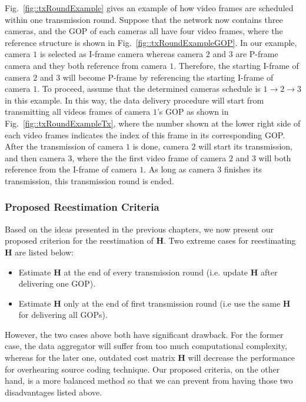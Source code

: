 {Fig.~\ref{fig::txRoundExample} gives an example of how video frames are scheduled within one transmission round.
Suppose that the network now contains three cameras, and the GOP of each cameras all have four video frames, where the reference structure is shown in Fig.~\ref{fig::txRoundExampleGOP}.
In our example, camera $1$ is selected as I-frame camera whereas camera $2$ and $3$ are P-frame camera and they both reference from camera $1$.
Therefore, the starting I-frame of camera $2$ and $3$ will become P-frame by referencing the starting I-frame of camera $1$.
To proceed, assume that the determined cameras schedule is $1 \rightarrow 2 \rightarrow 3$ in this example.
In this way, the data delivery procedure will start from transmitting all videos frames of camera $1$'s GOP as shown in Fig.~\ref{fig::txRoundExampleTx}, where the number shown at the lower right side of each video frames indicates the index of this frame in its corresponding GOP.
After the transmission of camera $1$ is done, camera $2$ will start its transmission, and then camera $3$, where the the first video frame of camera $2$ and $3$ will both reference from the I-frame of camera $1$.
As long as camera $3$ finishes its transmission, this transmission round is ended.
%
\subsubsection{Proposed Reestimation Criteria}
\label{sec::reestimationCriteria}
Based on the ideas presented in the previous chapters, we now present our proposed criterion for the reestimation of $\mathbf{H}$.
Two extreme cases for reestimating $\mathbf{H}$ are listed below:
\begin{itemize}
\item Estimate $\mathbf{H}$ at the end of every transmission round (i.e. update $\mathbf{H}$ after delivering one GOP).
\item Estimate $\mathbf{H}$ only at the end of first transmission round (i.e use the same $\mathbf{H}$ for delivering all GOPs).
\end{itemize}
However, the two cases above both have significant drawback.
For the former case, the data aggregator will suffer from too much computational complexity, whereas for the later one, outdated cost matrix $\mathbf{H}$ will decrease the performance for overhearing source coding technique.
Our proposed criteria, on the other hand, is a more balanced method so that we can prevent from having those two disadvantages listed above.

}
